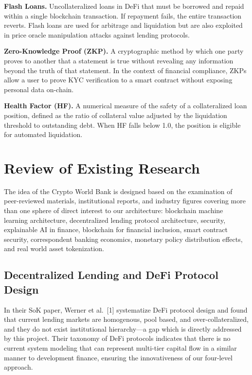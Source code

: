 \documentclass[12pt,a4paper]{report}
\begin{document}
\hangindent=0.5in \textbf{Flash Loans.} Uncollateralized loans in DeFi that must be borrowed and repaid within a single blockchain transaction. If repayment fails, the entire transaction reverts. Flash loans are used for arbitrage and liquidation but are also exploited in price oracle manipulation attacks against lending protocols.

\hangindent=0.5in \textbf{Zero-Knowledge Proof (ZKP).} A cryptographic method by which one party proves to another that a statement is true without revealing any information beyond the truth of that statement. In the context of financial compliance, ZKPs allow a user to prove KYC verification to a smart contract without exposing personal data on-chain.

\hangindent=0.5in \textbf{Health Factor (HF).} A numerical measure of the safety of a collateralized loan position, defined as the ratio of collateral value adjusted by the liquidation threshold to outstanding debt. When HF falls below 1.0, the position is eligible for automated liquidation.

\section{Review of Existing Research}

The idea of the Crypto World Bank is designed based on the examination of peer-reviewed materials, institutional reports, and industry figures covering more than one sphere of direct interest to our architecture: blockchain machine learning architecture, decentralized lending protocol architecture, security, explainable AI in finance, blockchain for financial inclusion, smart contract security, correspondent banking economics, monetary policy distribution effects, and real world asset tokenization.

\subsection{Decentralized Lending and DeFi Protocol Design}

In their SoK paper, Werner et al.~[1] systematize DeFi protocol design and found that current lending markets are homogenous, pool based, and over-collateralized, and they do not exist institutional hierarchy---a gap which is directly addressed by this project. Their taxonomy of DeFi protocols indicates that there is no current system modeling that can represent multi-tier capital flow in a similar manner to development finance, ensuring the innovativeness of our four-level approach.
\end{document}
